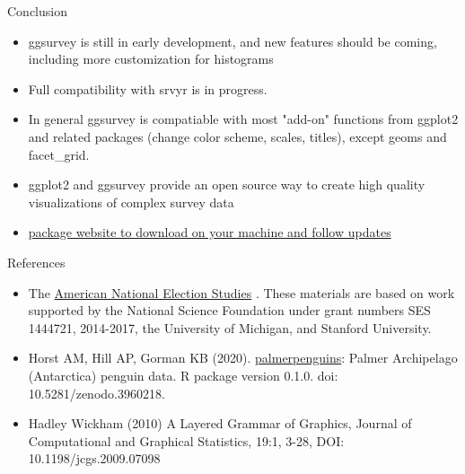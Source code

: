 \documentclass{beamer}\usepackage[]{graphicx}\usepackage[]{color}
\begin{document}
\begin{frame}{Conclusion}
\begin{itemize}
\item ggsurvey is still in early development, and new features should be coming, including more customization for histograms
\item Full compatibility with srvyr is in progress.
\item In general ggsurvey is compatiable with most "add-on" functions from ggplot2 and related packages  (change color scheme, scales, titles), except geoms and facet\_grid.
\item ggplot2 and ggsurvey provide an open source way to create high quality visualizations of complex survey data
\item \href{https://github.com/balexanderstats/ggsurvey}{package website to download on your machine and follow updates}
\end{itemize}
\end{frame}

\begin{frame}{References}
\begin{itemize}
\item The \href{https://electionstudies.org/}{American National Election Studies} . These materials are based on work supported by the National Science Foundation under grant numbers SES 1444721, 2014-2017, the University of Michigan, and Stanford University.
\item Horst AM, Hill AP, Gorman KB (2020). \href{https://allisonhorst.github.io/palmerpenguins/}{palmerpenguins}: Palmer Archipelago (Antarctica) penguin data. R package version 0.1.0.
 doi:   10.5281/zenodo.3960218.
\item Hadley Wickham (2010) A Layered Grammar of Graphics, Journal of Computational and Graphical Statistics, 19:1, 3-28, DOI: 10.1198/jcgs.2009.07098

\end{itemize}
\end{frame}
\end{document}
